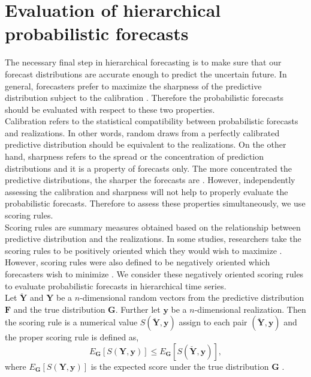 \documentclass[a4paper, 11pt]{article}
\begin{document}
\section{Evaluation of hierarchical probabilistic forecasts}

The necessary final step in hierarchical forecasting is to make sure that our forecast distributions are accurate enough to predict the uncertain future. In general, forecasters prefer to maximize the sharpness of the predictive distribution subject to the calibration \citep{Gneiting2014}. Therefore the probabilistic forecasts should be evaluated with respect to these two properties.\\

\noindent
Calibration refers to the statistical compatibility between probabilistic forecasts and realizations. In other words, random draws from a perfectly calibrated predictive distribution should be equivalent to the realizations. On the other hand, sharpness refers to the spread or the concentration of prediction distributions and it is a property of forecasts only. The more concentrated the predictive distributions, the sharper the forecasts are \citep{Gneiting2008}. However, independently assessing the calibration and sharpness will not help to properly evaluate the probabilistic forecasts. Therefore to assess these properties simultaneously, we use scoring rules. \\

\noindent
Scoring rules are summary measures obtained based on the relationship between predictive distribution and the realizations. In some studies, researchers take the scoring rules to be positively oriented which they would wish to maximize \citep{Gneiting2007}. However, scoring rules were also defined to be negatively oriented which forecasters wish to minimize \citep{Gneiting2014}. We consider these negatively oriented scoring rules to evaluate probabilistic forecasts in hierarchical time series. \\

\noindent
Let $\bm{{\breve{Y}}}$ and $\bm{Y}$ be a $n$-dimensional random vectors from the predictive distribution $\mathbold{F}$ and the true distribution $\mathbold{G}$. Further let $\mathbold{y}$ be a $n$-dimensional realization. Then the scoring rule is a numerical value $S(\mathbold{{\breve{Y}},y})$ assign to each pair $(\mathbold{{\breve{Y}},y})$ and the proper scoring rule is defined as,
\begin{equation}\label{eq:(3.1.)}
E_{\mathbold{G}}[S(\mathbold{Y,y})] \le E_{\mathbold{G}}[S(\mathbold{{\breve{Y}},y})],
\end{equation}
\noindent
where $E_{\mathbold{G}}[S(\mathbold{Y,y})]$ is the expected score under the true distribution $\mathbold{G}$ \citep{Gneiting2008, Gneiting2014}. \\
\end{document}
